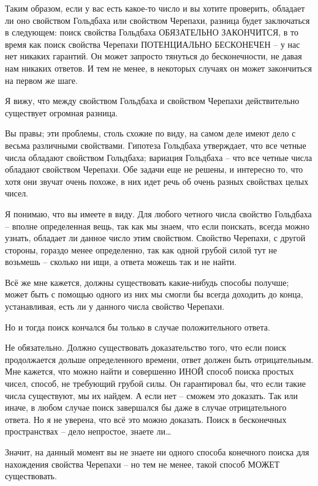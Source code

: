 \documentclass[../main.tex]{subfiles}
\begin{document}
\begin{dialogue}
 Таким образом, если у вас есть какое-то число и вы хотите проверить, обладает ли оно свойством Гольдбаха или свойством Черепахи, разница будет заключаться в следующем: поиск свойства Гольдбаха ОБЯЗАТЕЛЬНО ЗАКОНЧИТСЯ, в то время как поиск свойства Черепахи ПОТЕНЦИАЛЬНО БЕСКОНЕЧЕН \--- у нас нет никаких гарантий. Он может запросто тянуться до бесконечности, не давая нам никаких ответов. И тем не менее, в некоторых случаях он может закончиться на первом же шаге.

 Я вижу, что между свойством Гольдбаха и свойством Черепахи действительно существует огромная разница.

 Вы правы; эти проблемы, столь схожие по виду, на самом деле имеют дело с весьма различными свойствами. Гипотеза Гольдбаха утверждает, что все четные числа обладают свойством Гольдбаха; вариация Гольдбаха \--- что все четные числа обладают свойством Черепахи. Обе задачи еще не решены, и интересно то, что хотя они звучат очень похоже, в них идет речь об очень разных свойствах целых чисел.

 Я понимаю, что вы имеете в виду. Для любого четного числа свойство Гольдбаха \--- вполне определенная вещь, так как мы знаем, что если поискать, всегда можно узнать, обладает ли данное число этим свойством. Свойство Черепахи, с другой стороны, гораздо менее определенно, так как одной грубой силой тут не возьмешь \--- сколько ни ищи, а ответа можешь так и не найти.

 Всё же мне кажется, должны существовать какие-нибудь способы получше; может быть с помощью одного из них мы смогли бы всегда доходить до конца, устанавливая, есть ли у данного числа свойство Черепахи.

 Но и тогда поиск кончался бы только в случае положительного ответа.

 Не обязательно. Должно существовать доказательство того, что если поиск продолжается дольше определенного времени, ответ должен быть отрицательным. Мне кажется, что можно найти и совершенно ИНОЙ способ поиска простых чисел, способ, не требующий грубой силы. Он гарантировал бы, что если такие числа существуют, мы их найдем. А если нет \--- сможем это доказать. Так или иначе, в любом случае поиск завершался бы даже в случае отрицательного ответа. Но я не уверена, что всё это можно доказать. Поиск в бесконечных пространствах \--- дело непростое, знаете ли\ldots{}

 Значит, на данный момент вы не знаете ни одного способа конечного поиска для нахождения свойства Черепахи \--- но тем не менее, такой способ МОЖЕТ существовать.


\end{dialogue}
\end{document}
